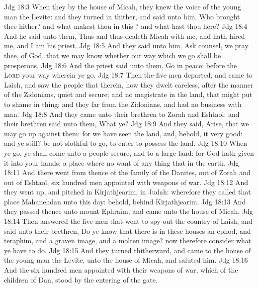 \vs Jdg 18:3 When they  by the house of Micah, they knew the voice of the young man the Levite: and they turned in thither, and said unto him, Who brought thee hither? and what makest thou in this ? and what hast thou here?
\vs Jdg 18:4 And he said unto them, Thus and thus dealeth Micah with me, and hath hired me, and I am his priest.
\vs Jdg 18:5 And they said unto him, Ask counsel, we pray thee, of God, that we may know whether our way which we go shall be prosperous.
\vs Jdg 18:6 And the priest said unto them, Go in peace: before the \textsc{Lord}  your way wherein ye go.
\vs Jdg 18:7 Then the five men departed, and came to Laish, and saw the people that  therein, how they dwelt careless, after the manner of the Zidonians, quiet and secure; and  no magistrate in the land, that might put  to shame in  thing; and they  far from the Zidonians, and had no business with  man.
\vs Jdg 18:8 And they came unto their brethren to Zorah and Eshtaol: and their brethren said unto them, What  ye?
\vs Jdg 18:9 And they said, Arise, that we may go up against them: for we have seen the land, and, behold, it  very good: and  ye still? be not slothful to go,  to enter to possess the land.
\vs Jdg 18:10 When ye go, ye shall come unto a people secure, and to a large land: for God hath given it into your hands; a place where  no want of any thing that  in the earth.
\vs Jdg 18:11 And there went from thence of the family of the Danites, out of Zorah and out of Eshtaol, six hundred men appointed with weapons of war.
\vs Jdg 18:12 And they went up, and pitched in Kirjathjearim, in Judah: wherefore they called that place Mahanehdan unto this day: behold,  behind Kirjathjearim.
\vs Jdg 18:13 And they passed thence unto mount Ephraim, and came unto the house of Micah.
\vs Jdg 18:14 Then answered the five men that went to spy out the country of Laish, and said unto their brethren, Do ye know that there is in these houses an ephod, and teraphim, and a graven image, and a molten image? now therefore consider what ye have to do.
\vs Jdg 18:15 And they turned thitherward, and came to the house of the young man the Levite,  unto the house of Micah, and saluted him.
\vs Jdg 18:16 And the six hundred men appointed with their weapons of war, which  of the children of Dan, stood by the entering of the gate.
